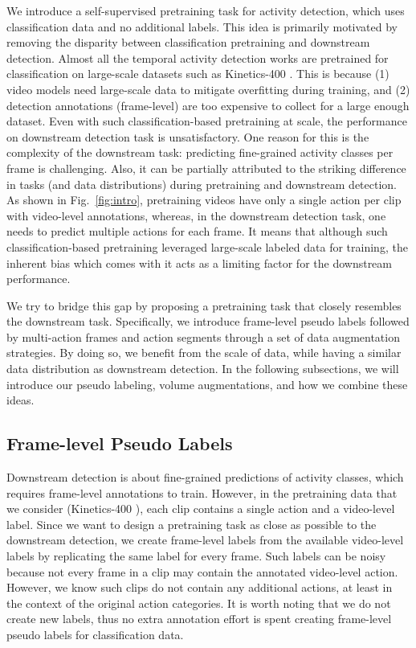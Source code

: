 \documentclass[10pt,twocolumn,letterpaper]{article}
\newcommand{\fref}[1]{Fig.~\ref{#1}}
\begin{document}
We introduce a self-supervised pretraining task for activity detection, which uses classification data and no additional labels. This idea is primarily motivated by removing the disparity between classification pretraining and downstream detection. Almost all the temporal activity detection works are pretrained for classification on large-scale datasets such as Kinetics-400 \cite{carreira2017quo}. This is because (1) video models need large-scale data to mitigate overfitting during training, and (2) detection annotations (frame-level) are too expensive to collect for a large enough dataset. Even with such classification-based pretraining at scale, the performance on downstream detection task is unsatisfactory. One reason for this is the complexity of the downstream task: predicting fine-grained activity classes per frame is challenging. Also, it can be partially attributed to the striking difference in tasks (and data distributions) during pretraining and downstream detection. As shown in \fref{fig:intro}, pretraining videos have only a single action per clip with video-level annotations, whereas, in the downstream detection task, one needs to predict multiple actions for each frame. It means that although such classification-based pretraining leveraged large-scale labeled data for training, the inherent bias which comes with it acts as a limiting factor for the downstream performance. 

We try to bridge this gap by proposing a pretraining task that closely resembles the downstream task. Specifically, we introduce frame-level pseudo labels followed by multi-action frames and action segments through a set of data augmentation strategies. By doing so, we benefit from the scale of data, while having a similar data distribution as downstream detection. In the following subsections, we will introduce our pseudo labeling, volume augmentations, and how we combine these ideas.

\vspace{-1mm}
\subsection{Frame-level Pseudo Labels}
\vspace{-1mm}

Downstream detection is about fine-grained predictions of activity classes, which requires frame-level annotations to train. However, in the pretraining data that we consider (Kinetics-400 \cite{carreira2017quo}), each clip contains a single action and a video-level label. Since we want to design a pretraining task as close as possible to the downstream detection, we create frame-level labels from the available video-level labels by replicating the same label for every frame. Such labels can be noisy because not every frame in a clip may contain the annotated video-level action. However, we know such clips do not contain any additional actions, at least in the context of the original action categories. It is worth noting that we do not create new labels, thus no extra annotation effort is spent creating frame-level pseudo labels for classification data.
\end{document}
